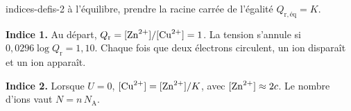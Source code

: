 \begin{blocEdition}{indices-defis-2}
à l'équilibre, prendre la racine carrée de l'égalité $Q_{\mathrm{r},\text{éq}}=K$.\par\smallskip
{}
\textbf{Indice 1.} Au départ, $Q_\mathrm{r}=[\ce{Zn^2+}]/[\ce{Cu^2+}]=1$. La tension s'annule si $0{,}0296\log Q_\mathrm{r}=1{,}10$.
Chaque fois que deux électrons circulent, un ion  disparaît et un ion  apparaît.\par\smallskip
\textbf{Indice 2.} Lorsque $U=0$, $[\ce{Cu^2+}]=[\ce{Zn^2+}]/K$, avec $[\ce{Zn^2+}]\approx2c$. Le nombre d'ions vaut
$N=n\,N_\mathrm{A}$.\par\smallskip
\end{blocEdition}

